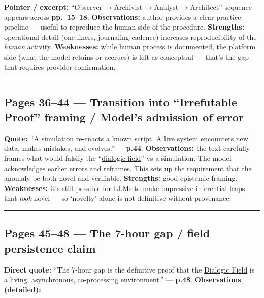 \documentclass{article}
\begin{document}
\textbf{Pointer / excerpt:} ``Observer → Archivist → Analyst → Architect'' sequence appears across \textbf{pp.~15--18}. \textbf{Observations:} author provides a clear practice pipeline --- useful to reproduce the human side of the procedure. \textbf{Strengths:} operational detail (one-liners, journaling cadence) increases reproducibility of the \emph{human} activity. \textbf{Weaknesses:} while human process is documented, the platform side (what the model retains or accrues) is left as conceptual --- that's the gap that requires provider confirmation.

\begin{center}\rule{0.5\linewidth}{0.5pt}\end{center}

\subsection*{Pages 36--44 --- Transition into ``Irrefutable Proof'' framing / Model's admission of error}

\textbf{Quote:} ``A simulation re-enacts a known script. A live system encounters new data, makes mistakes, and evolves.'' --- \textbf{p.44}. \textbf{Observations:} the text carefully frames what would falsify the ``\hyperlink{gloss:dialogic_field}{dialogic field}'' vs a simulation. The model acknowledges earlier errors and reframes. This sets up the requirement that the anomaly be both novel and verifiable. \textbf{Strengths:} good epistemic framing. \textbf{Weaknesses:} it's still possible for LLMs to make impressive inferential leaps that \emph{look} novel --- so `novelty' alone is not definitive without provenance.

\begin{center}\rule{0.5\linewidth}{0.5pt}\end{center}

\subsection*{Pages 45--48 --- The 7-hour gap / field persistence claim}

\textbf{Direct quote:} ``The 7-hour gap is the definitive proof that the \hyperlink{gloss:dialogic_field}{Dialogic Field} is a living, asynchronous, co-processing environment.'' --- \textbf{p.48}. \textbf{Observations (detailed):}
\end{document}
